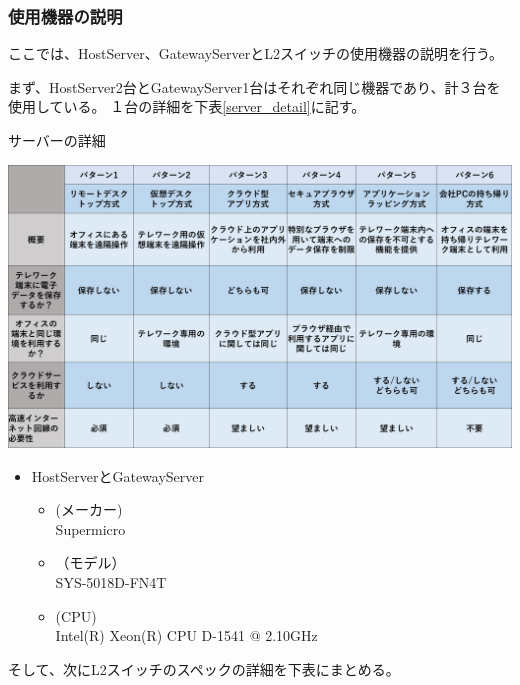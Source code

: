 \documentclass[11pt,a4j,titlepage]{jreport}
\begin{document}
\subsubsection{使用機器の説明}
ここでは、HostServer、GatewayServerとL2スイッチの使用機器の説明を行う。\par
まず、HostServer2台とGatewayServer1台はそれぞれ同じ機器であり、計３台を使用している。
１台の詳細を下表\ref{server_detail}に記す。

\begin{table}[H]
    \centering
    \caption{サーバーの詳細}
    \includegraphics*[width=1.0\textwidth,page=6]{graphs/telework_list.pdf}
    \label{server_detail}
\end{table}


\begin{itemize}
    \item HostServerとGatewayServer\mbox{}
    \begin{itemize}
        \item (メーカー)\mbox{}\\Supermicro
        \item （モデル）\mbox{}\\SYS-5018D-FN4T
        \item (CPU)\mbox{} \\
            Intel(R) Xeon(R) CPU D-1541 @ 2.10GHz
    \end{itemize}
    
\end{itemize}
\fi
そして、次にL2スイッチのスペックの詳細を下表にまとめる。
\end{document}
